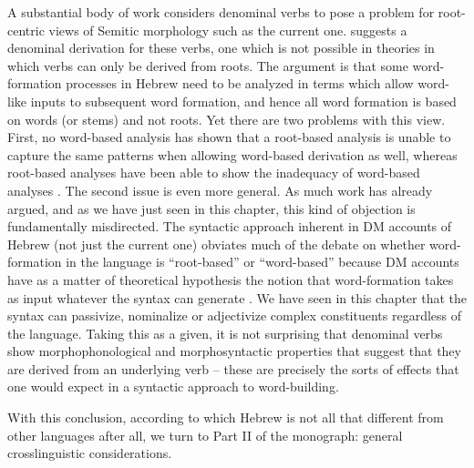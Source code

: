 A substantial body of work considers denominal verbs to pose a problem for root-centric views of Semitic morphology such as the current one. \cite{batel94,batel03,batel17} suggests a denominal derivation for these verbs, one which is not possible in theories in which verbs can only be derived from roots. The argument is that some word-formation processes in Hebrew need to be analyzed in terms which allow word-like inputs to subsequent word formation, and hence all word formation is based on words (or stems) and not roots. Yet there are two problems with this view. First, no word-based analysis has shown that a root-based analysis is unable to capture the same patterns when allowing word-based derivation as well, whereas root-based analyses have been able to show the inadequacy of word-based analyses \citep{kastner18nllt}. The second issue is even more general. As much work \citep{arad03,arad05,doron03} has already argued, and as we have just seen in this chapter, this kind of objection is fundamentally misdirected. The syntactic approach inherent in DM accounts of Hebrew (not just the current one) obviates much of the debate on whether word-formation in the language is ``root-based'' or ``word-based'' because DM accounts have as a matter of theoretical hypothesis the notion that word-formation takes as input whatever the syntax can generate \citep{kastnertucker19cup}. We have seen in this chapter that the syntax can passivize, nominalize or adjectivize complex constituents regardless of the language. Taking this as a given, it is not surprising that denominal verbs show morphophonological and morphosyntactic properties that suggest that they are derived from an underlying verb -- these are precisely the sorts of effects that one would expect in a syntactic approach to word-building.

With this conclusion, according to which Hebrew is not all that different from other languages after all, we turn to Part II of the monograph: general crosslinguistic considerations.
